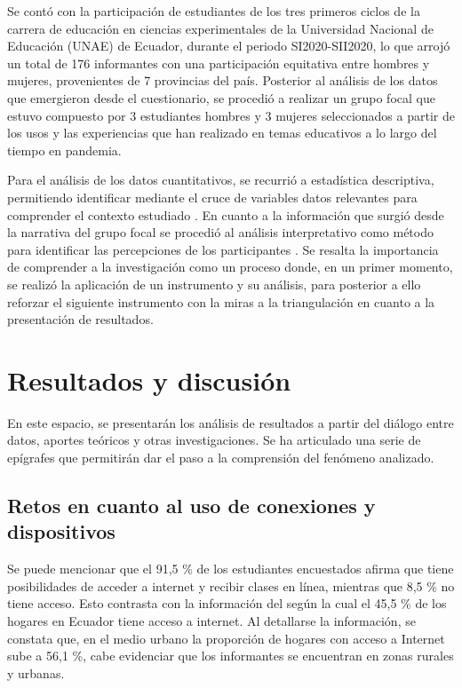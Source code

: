 \documentclass[spanish]{textolivre}
\begin{document}
Se contó con la participación de estudiantes de los tres primeros ciclos de la carrera de educación en ciencias experimentales de la Universidad Nacional de Educación (UNAE) de Ecuador, durante el periodo SI2020-SII2020, lo que arrojó un total de 176 informantes con una participación equitativa entre hombres y mujeres, provenientes de 7 provincias del país. Posterior al análisis de los datos que emergieron desde el cuestionario, se procedió a realizar un grupo focal que estuvo compuesto por 3 estudiantes hombres y 3 mujeres seleccionados a partir de los usos y las experiencias que han realizado en temas educativos a lo largo del tiempo en pandemia. 

Para el análisis de los datos cuantitativos, se recurrió a estadística descriptiva, permitiendo identificar mediante el cruce de variables datos relevantes para comprender el contexto estudiado \cite{ordonez_pinzon_estudio_2006}. En cuanto a la información que surgió desde la narrativa del grupo focal se procedió al análisis interpretativo como método para identificar las percepciones de los participantes \cite{onwuegbuzie_marco_2011}. Se resalta la importancia de comprender a la investigación como un proceso donde, en un primer momento, se realizó la aplicación de un instrumento y su análisis,  para posterior a ello reforzar el siguiente instrumento con la miras a la triangulación en cuanto a la presentación de resultados. 

\section{Resultados y discusión}\label{sec-conduta}
En este espacio, se presentarán los análisis de resultados a partir del diálogo entre datos, aportes teóricos y otras investigaciones. Se ha articulado una serie de epígrafes que permitirán dar el paso a la comprensión del fenómeno analizado. 

\subsection{Retos en cuanto al uso de conexiones y dispositivos}\label{sec-fmt-manuscrito}
Se puede mencionar que el 91,5 \% de los estudiantes encuestados afirma que tiene posibilidades de acceder a internet y recibir clases en línea, mientras que 8,5 \% no tiene acceso. Esto contrasta con la información del \textcite{instituto_nacional_de_estadisticas_y_censos_de_ecuador_[inec]_encuesta_2020} según la cual el 45,5 \% de los hogares en Ecuador tiene acceso a internet. Al detallarse la información, se constata que, en el medio urbano la proporción de hogares con acceso a Internet sube a 56,1 \%, cabe evidenciar que los informantes se encuentran en zonas rurales y urbanas. 
\end{document}
